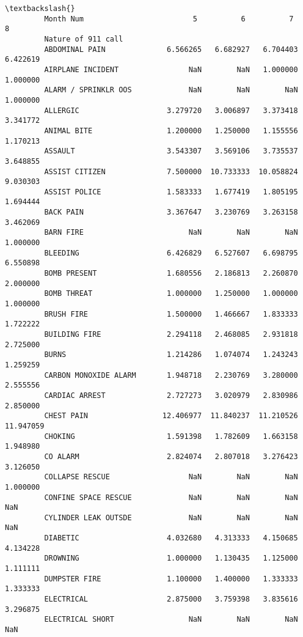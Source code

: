 \documentclass[11pt]{article}
\begin{document}
\begin{Verbatim}[commandchars=\\\{\}]
                                                                                \textbackslash{}
         Month Num                         5          6          7          8    
         Nature of 911 call                                                      
         ABDOMINAL PAIN              6.566265   6.682927   6.704403   6.422619   
         AIRPLANE INCIDENT                NaN        NaN   1.000000   1.000000   
         ALARM / SPRINKLR OOS             NaN        NaN        NaN   1.000000   
         ALLERGIC                    3.279720   3.006897   3.373418   3.341772   
         ANIMAL BITE                 1.200000   1.250000   1.155556   1.170213   
         ASSAULT                     3.543307   3.569106   3.735537   3.648855   
         ASSIST CITIZEN              7.500000  10.733333  10.058824   9.030303   
         ASSIST POLICE               1.583333   1.677419   1.805195   1.694444   
         BACK PAIN                   3.367647   3.230769   3.263158   3.462069   
         BARN FIRE                        NaN        NaN        NaN   1.000000   
         BLEEDING                    6.426829   6.527607   6.698795   6.550898   
         BOMB PRESENT                1.680556   2.186813   2.260870   2.000000   
         BOMB THREAT                 1.000000   1.250000   1.000000   1.000000   
         BRUSH FIRE                  1.500000   1.466667   1.833333   1.722222   
         BUILDING FIRE               2.294118   2.468085   2.931818   2.725000   
         BURNS                       1.214286   1.074074   1.243243   1.259259   
         CARBON MONOXIDE ALARM       1.948718   2.230769   3.280000   2.555556   
         CARDIAC ARREST              2.727273   3.020979   2.830986   2.850000   
         CHEST PAIN                 12.406977  11.840237  11.210526  11.947059   
         CHOKING                     1.591398   1.782609   1.663158   1.948980   
         CO ALARM                    2.824074   2.807018   3.276423   3.126050   
         COLLAPSE RESCUE                  NaN        NaN        NaN   1.000000   
         CONFINE SPACE RESCUE             NaN        NaN        NaN        NaN   
         CYLINDER LEAK OUTSDE             NaN        NaN        NaN        NaN   
         DIABETIC                    4.032680   4.313333   4.150685   4.134228   
         DROWNING                    1.000000   1.130435   1.125000   1.111111   
         DUMPSTER FIRE               1.100000   1.400000   1.333333   1.333333   
         ELECTRICAL                  2.875000   3.759398   3.835616   3.296875   
         ELECTRICAL SHORT                 NaN        NaN        NaN        NaN   

\end{Verbatim}
\end{document}
